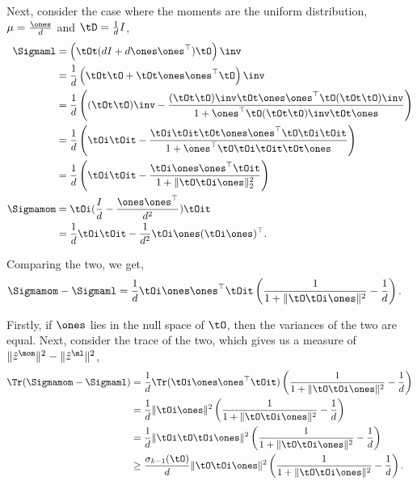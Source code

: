 Next, consider the case where the moments are the uniform distribution,
$\mu = \frac{\ones}{d}$ and $\tD = \frac{1}{d} I$,
\begin{align*}
    \Sigmaml 
      &= \left( \tOt(d I + d \ones \ones^\top) \tO \right)\inv \\
      &= \frac{1}{d} \left( \tOt\tO + \tOt\ones \ones^\top \tO \right)\inv \\
      &= \frac{1}{d} \left(
      (\tOt\tO)\inv - \frac{(\tOt\tO)\inv \tOt\ones \ones^\top \tO (\tOt\tO)\inv}
        {1 + \ones^\top \tO (\tOt\tO)\inv \tOt\ones} 
        \right)\\
      &= \frac{1}{d} \left(
      \tOi\tOit - \frac{\tOi\tOit\tOt \ones \ones^\top \tO\tOi\tOit}
        {1+ \ones^\top \tO \tOi \tOit \tOt\ones} 
        \right)
        \\
      &= \frac{1}{d} \left(
      \tOi\tOit - \frac{\tOi \ones \ones^\top \tOit}
        {1+ \|\tO \tOi \ones\|_2^2} 
        \right) \\
    \Sigmamom 
    &= \tOi (\frac{I}{d} - \frac{\ones \ones^\top}{d^2}) \tOit \\
    &= \frac{1}{d} \tOi\tOit - \frac{1}{d^2} \tOi \ones (\tOi \ones)^\top.
\end{align*}

Comparing the two, we get,
\begin{align*}
    \Sigmamom - \Sigmaml 
    &= \frac{1}{d} 
    \tOi \ones \ones^\top \tOit \left(
    \frac{1}{1+ \|\tO \tOi \ones \|^2} - \frac{1}{d}
    \right).
\end{align*}

Firstly, if $\ones$ lies in the null space of $\tO$, then the variances
of the two are equal. 
Next, consider the trace of the two, which gives
us a measure of $\|\hat{z}^\mom\|^2 - \|\hat{z}^\ml\|^2$,
\begin{align*}
    \Tr(\Sigmamom - \Sigmaml)
    &= \frac{1}{d} 
    \Tr(\tOi \ones \ones^\top \tOit) \left(
    \frac{1}{1+ \| \tO \tOi \ones\|^2} - \frac{1}{d}
    \right) \\
    &= \frac{1}{d} \|\tOi \ones\|^2 \left(
    \frac{1}{1+ \| \tO \tOi \ones\|^2} - \frac{1}{d}
    \right) \\
    &= \frac{1}{d} \|\tOi \tO \tOi \ones\|^2 \left(
    \frac{1}{1+ \| \tO \tOi \ones\|^2} - \frac{1}{d}
    \right) \\
    &\ge \frac{\sigma_{k-1}(\tO)}{d} \|\tO \tOi \ones\|^2 \left(
    \frac{1}{1+ \| \tO \tOi \ones\|^2} - \frac{1}{d}
    \right).
\end{align*}


